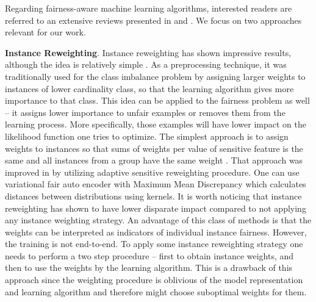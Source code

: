 \documentclass[preprint,12pt]{elsarticle}
\begin{document}
Regarding fairness-aware machine learning algorithms, interested readers are referred to an extensive reviews presented in \cite{friedler2019comparative} and \cite{corbett2018measure}. We focus on two approaches relevant for our work.

\textbf{Instance Reweighting}. Instance reweighting has shown impressive results, although the idea is relatively simple \cite{feldman2015certifying, krasanakis2018adaptive}. As a preprocessing technique, it was traditionally used for the class imbalance problem by assigning larger weights to instances of lower cardinality class, so that the learning algorithm gives more importance to that class. This idea can be applied to the fairness problem as well -- it assigns lower importance to unfair examples or removes them from the learning process. More specifically, those examples will have lower impact on the likelihood function one tries to optimize.
The simplest approach is to assign weights to instances so that sums of weights per value of sensitive feature is the same and all instances from a group have the same weight \cite{kamiran2012data}. That approach was improved in \cite{krasanakis2018adaptive} by utilizing adaptive sensitive reweighting procedure. One can use variational fair auto encoder with Maximum Mean Discrepancy \cite{louizos2015variational} which calculates distances between distributions using kernels. It is worth noticing that instance reweighting has shown to have lower disparate impact \cite{feldman2015certifying} compared to not applying any instance weighting strategy. An advantage of this class of methods is that the weights can be interpreted as indicators of individual instance fairness. However, the training is not end-to-end. To apply some instance reweighting strategy one needs to perform a two step procedure -- first to obtain instance weights, and then to use the weights by the learning algorithm. This is a drawback of this approach since the weighting procedure is oblivious of the model representation and learning algorithm and therefore might choose suboptimal weights for them.
\end{document}
